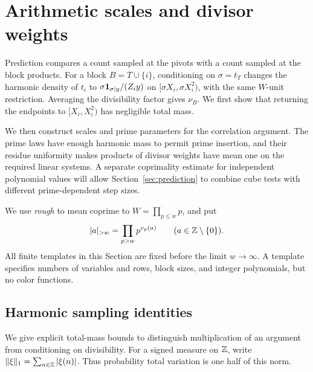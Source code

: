 \section{Arithmetic scales and divisor weights}\label{sec:arithmetic}

Prediction compares a count sampled at the pivots with a count sampled
at the block products.  For a block \(B=T\cup\{i\}\), conditioning on
\(\sigma=t_T\) changes the harmonic density of \(t_i\) to
\(\sigma\mathbf 1_{\sigma\mid y}/(Z_i y)\) on
\([\sigma X_i,\sigma X_i^2)\), with the same \(W\)-unit restriction.
Averaging the divisibility factor gives \(\nu_B\).  We first show that
returning the endpoints to \([X_i,X_i^2)\) has negligible total mass.

We then construct scales and prime parameters for the correlation
argument.  The prime laws have enough harmonic mass to permit prime
insertion, and their residue uniformity makes products of divisor
weights have mean one on the required linear systems.  A separate
coprimality estimate for independent polynomial values will allow
Section~\ref{sec:prediction} to combine cube tests with different
prime-dependent step sizes.

We use \emph{rough} to mean coprime to \(W=\prod_{p\le w}p\), and put
\[
 |a|_{>w}=\prod_{p>w}p^{v_p(a)}\qquad(a\in\mathbb Z\setminus\{0\}).
\]
All finite templates in this Section are fixed before the limit
\(w\to\infty\).  A template specifies numbers of variables and rows,
block sizes, and integer polynomials, but no color functions.

\subsection{Harmonic sampling identities}

We give explicit total-mass bounds to distinguish multiplication of
an argument from conditioning on divisibility.  For a signed measure
on \(\mathbb Z\), write \(\|\xi\|_1=\sum_{n\in\mathbb Z}|\xi(n)|\).
Thus probability total variation is one half of this norm.

